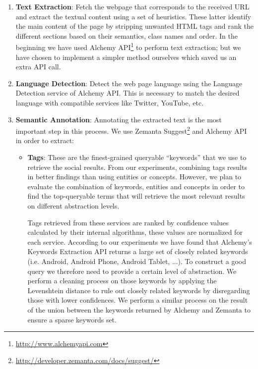 \begin{enumerate}

  \item \textbf{Text Extraction}: Fetch the webpage that corresponds to the received URL and extract the textual content using a set of heuristics. These latter identify the main content of the page by stripping unwanted HTML tags and rank the different sections based on their semantics, class names and order. In the beginning we have used Alchemy API\footnote{\url{http://www.alchemyapi.com}} to perform text extraction; but we have chosen to implement a simpler method ourselves which saved us an extra API call.

  \item \textbf{Language Detection}: Detect the web page language using the Language Detection service of Alchemy API. This is necessary to match the desired language with compatible services like Twitter, YouTube, etc.

  \item \textbf{Semantic Annotation}: Annotating the extracted text is the most important step in this process. We use Zemanta Suggest\footnote{\url{http://developer.zemanta.com/docs/suggest/}} and Alchemy API in order to extract:

  \begin{itemize}

    \item \textbf{Tags}: These are the finest-grained queryable ``keywords'' that we use to retrieve the social results. From our experiments, combining tags results in better findings than using entities or concepts. However, we plan to evaluate the combination of keywords, entities and concepts in order to find the top-queryable terms that will retrieve the most relevant results on different abstraction levels.

    Tags retrieved from these services are ranked by confidence values calculated by their internal algorithms, these values are normalized for each service. According to our experiments we have found that Alchemy's Keywords Extraction API returns a large set of closely related keywords (i.e. Android, Android Phone, Android Tablet, ...). To construct a good query we therefore need to provide a certain level of abstraction. We perform a cleaning process on those keywords by applying the Levenshtein distance to rule out closely related keywords by disregarding those with lower confidences. We perform a similar process on the result of the union between the keywords returned by Alchemy and Zemanta to ensure a sparse keywords set.


\end{itemize}
\end{enumerate}
